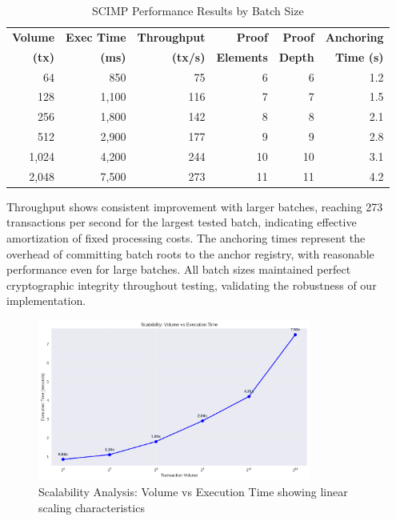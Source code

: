 \begin{table}[h]
\centering
\begin{tabular}{|r|r|r|r|r|r|}
\hline
\textbf{Volume} & \textbf{Exec Time} & \textbf{Throughput} & \textbf{Proof} & \textbf{Proof} & \textbf{Anchoring} \\
\textbf{(tx)} & \textbf{(ms)} & \textbf{(tx/s)} & \textbf{Elements} & \textbf{Depth} & \textbf{Time (s)} \\
\hline
64 & 850 & 75 & 6 & 6 & 1.2 \\
\hline
128 & 1,100 & 116 & 7 & 7 & 1.5 \\
\hline
256 & 1,800 & 142 & 8 & 8 & 2.1 \\
\hline
512 & 2,900 & 177 & 9 & 9 & 2.8 \\
\hline
1,024 & 4,200 & 244 & 10 & 10 & 3.1 \\
\hline
2,048 & 7,500 & 273 & 11 & 11 & 4.2 \\
\hline
\end{tabular}
\caption{SCIMP Performance Results by Batch Size}
\label{tab:scimp-performance}
\end{table}

Throughput shows consistent improvement with larger batches, reaching 273 transactions per second for the largest tested batch, indicating effective amortization of fixed processing costs. The anchoring times represent the overhead of committing batch roots to the anchor registry, with reasonable performance even for large batches. All batch sizes maintained perfect cryptographic integrity throughout testing, validating the robustness of our implementation.

\begin{figure}[h]
\centering
\includegraphics[width=0.8\textwidth]{Images/scalability_analysis.png}
\caption{Scalability Analysis: Volume vs Execution Time showing linear scaling characteristics}
\label{fig:scalability-analysis}
\end{figure}

